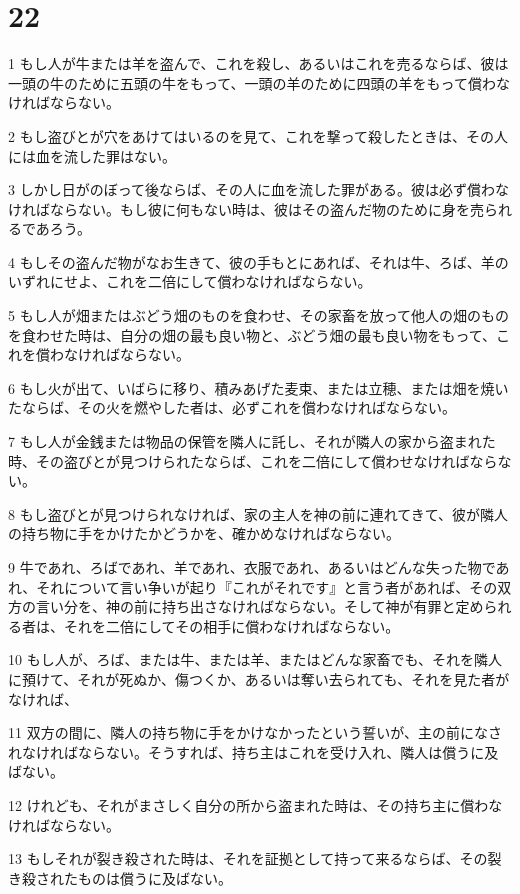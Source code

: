 \chapter{22}

\par 1 もし人が牛または羊を盗んで、これを殺し、あるいはこれを売るならば、彼は一頭の牛のために五頭の牛をもって、一頭の羊のために四頭の羊をもって償わなければならない。
\par 2 もし盗びとが穴をあけてはいるのを見て、これを撃って殺したときは、その人には血を流した罪はない。
\par 3 しかし日がのぼって後ならば、その人に血を流した罪がある。彼は必ず償わなければならない。もし彼に何もない時は、彼はその盗んだ物のために身を売られるであろう。
\par 4 もしその盗んだ物がなお生きて、彼の手もとにあれば、それは牛、ろば、羊のいずれにせよ、これを二倍にして償わなければならない。
\par 5 もし人が畑またはぶどう畑のものを食わせ、その家畜を放って他人の畑のものを食わせた時は、自分の畑の最も良い物と、ぶどう畑の最も良い物をもって、これを償わなければならない。
\par 6 もし火が出て、いばらに移り、積みあげた麦束、または立穂、または畑を焼いたならば、その火を燃やした者は、必ずこれを償わなければならない。
\par 7 もし人が金銭または物品の保管を隣人に託し、それが隣人の家から盗まれた時、その盗びとが見つけられたならば、これを二倍にして償わせなければならない。
\par 8 もし盗びとが見つけられなければ、家の主人を神の前に連れてきて、彼が隣人の持ち物に手をかけたかどうかを、確かめなければならない。
\par 9 牛であれ、ろばであれ、羊であれ、衣服であれ、あるいはどんな失った物であれ、それについて言い争いが起り『これがそれです』と言う者があれば、その双方の言い分を、神の前に持ち出さなければならない。そして神が有罪と定められる者は、それを二倍にしてその相手に償わなければならない。
\par 10 もし人が、ろば、または牛、または羊、またはどんな家畜でも、それを隣人に預けて、それが死ぬか、傷つくか、あるいは奪い去られても、それを見た者がなければ、
\par 11 双方の間に、隣人の持ち物に手をかけなかったという誓いが、主の前になされなければならない。そうすれば、持ち主はこれを受け入れ、隣人は償うに及ばない。
\par 12 けれども、それがまさしく自分の所から盗まれた時は、その持ち主に償わなければならない。
\par 13 もしそれが裂き殺された時は、それを証拠として持って来るならば、その裂き殺されたものは償うに及ばない。
